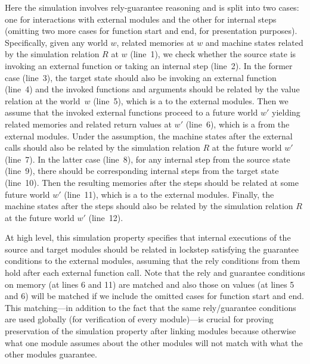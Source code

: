 Here the simulation involves rely-guarantee reasoning and is split
into two cases: one for interactions with external modules and the
other for internal steps (omitting two more cases for function start and end,
for presentation purposes). Specifically, given
any world $w$, related memories at $w$ and machine states related by
the simulation relation $R$ at $w$ (line~1), we check whether the
source state is invoking an external function or taking an internal
step (line~2). In the former case (line~3), the target state should
also be invoking an external function (line~4) and the invoked
functions and arguments should be related by the value relation at the
world~$w$ (line~5), which is a  to the external modules.
Then we assume that the invoked external
functions proceed to a future world $w'$ yielding related memories and
related return values at $w'$ (line~6), which is a  from the external modules.
Under the assumption, the machine
states after the external calls should also be related by the
simulation relation $R$ at the future world $w'$ (line~7). In the
latter case (line~8), for any internal step from the source state
(line~9), there should be corresponding internal steps from the
target state (line~10).  Then the resulting memories after the steps
should be related at some future world $w'$ (line~11), which is a
 to the external modules.  Finally, the
machine states after the steps should also be related by the
simulation relation $R$ at the future world $w'$ (line~12).

At high level, this simulation property specifies that internal
executions of the source and target modules should be related in
lockstep satisfying the guarantee conditions to the external modules,
assuming that the rely conditions from them hold after each external
function call.  Note that the rely and guarantee conditions on memory
(at lines 6 and 11) are matched and also those on values (at lines 5
and 6) will be matched if we include the omitted cases for function
start and end. This matching---in addition to the fact that the same
rely/guarantee conditions are used globally (\ie for verification of
every module)---is crucial for proving preservation of the simulation
property after linking modules because otherwise what one module
assumes about the other modules will not match with what the other
modules guarantee.

